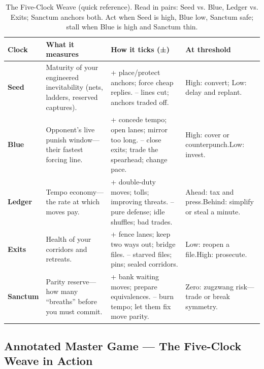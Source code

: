 \documentclass[11pt]{article}
\renewcommand{\arraystretch}{1.15}
\begin{document}
\begin{table}[h]
\centering
\renewcommand{\arraystretch}{1.1}
\begin{tabular}{p{2.6cm} p{5.2cm} p{5.0cm} p{3.2cm}}
\hline
\textbf{Clock} & \textbf{What it measures} & \textbf{How it ticks (±)} & \textbf{At threshold} \\
\hline
\textbf{Seed} &
Maturity of your engineered inevitability (nets, ladders, reserved captures). &
{+ place/protect anchors; force cheap replies.\newline
-- lines cut; anchors traded off.} &
High: convert; Low: delay and replant. \\
\hline
\textbf{Blue} &
Opponent’s live punish window—their fastest forcing line. &
{+ concede tempo; open lanes; mirror too long.\newline
-- close exits; trade the spearhead; change pace.} &
High: cover or counterpunch.\newline Low: invest. \\
\hline
\textbf{Ledger} &
Tempo economy—the rate at which moves pay. &
{+ double-duty moves; tolls; improving threats.\newline
-- pure defense; idle shuffles; bad trades.} &
Ahead: tax and press.\newline Behind: simplify or steal a minute. \\
\hline
\textbf{Exits} &
Health of your corridors and retreats. &
{+ fence lanes; keep two ways out; bridge files.\newline
-- starved files; pins; sealed corridors.} &
Low: reopen a file.\newline High: prosecute. \\
\hline
\textbf{Sanctum} &
Parity reserve—how many “breaths” before you must commit. &
{+ bank waiting moves; prepare equivalences.\newline
-- burn tempo; let them fix move parity.} &
Zero: zugzwang risk—trade or break symmetry. \\
\hline
\end{tabular}
\caption{The Five-Clock Weave (quick reference). Read in pairs: Seed vs. Blue, Ledger vs. Exits; Sanctum anchors both. Act when Seed is high, Blue low, Sanctum safe; stall when Blue is high and Sanctum thin.}
\end{table}

\clearpage

\subsection*{Annotated Master Game — The Five-Clock Weave in Action}
\label{sec:annotated-five-breath}
\end{document}
